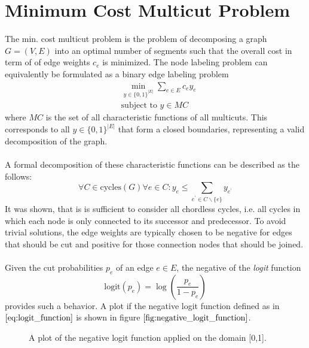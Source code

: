 

\section{Minimum Cost Multicut Problem}



The min. cost multicut problem is the problem of decomposing a graph $G = (V, E)$ into an optimal number of segments such that the overall cost in term of of edge weights $c_e$ is minimized. The node labeling problem can equivalently be formulated as a binary edge labeling problem
\begin{equation}
\begin{aligned}
& \min_{y \in \{0,1 \}^{|E|}} \sum_{e \in E} c_e y_e \\
& \text{subject to } y \in MC
\end{aligned}
\end{equation}
where $MC$ is the set of all characteristic functions of all multicuts. This corresponds to all $y \in \{0,1 \}^{|E|}$ that form a closed boundaries, representing a valid decomposition of the graph. \\ \\
A formal decomposition of these characteristic functions can be described as the follows:
\begin{equation}
	\forall C \in \text{cycles}(G) \forall e \in C: y_e \leq \sum_{e^{'} \in C \backslash \{e\}} y_{e^{'}}
\end{equation}
It was shown, that is is sufficient to consider all chordless cycles, i.e. all cycles in which each node is only connected to its successor and predecessor. To avoid trivial solutions, the edge weights are typically chosen to be negative for edges that should be cut and positive for those connection nodes that should be joined. \\ \\
Given the cut probabilities $p_e$ of an edge $e \in E$, the negative of the \textit{logit} function 
\begin{equation}
	\text{logit}\left( p_e \right) = \log \left( \frac{p_e}{1 - p_e} \right)
	\label{eq:logit_function}
\end{equation}
provides such a behavior. A plot if the negative logit function defined as in $\ref{eq:logit_function}$ is shown in figure $\ref{fig:negative_logit_function}$.
\begin{figure}
\centering
{}
\caption[Logit Function Plot]{A plot of the negative logit function applied on the domain [0,1].}
\label{fig:negative_logit_function}
\end{figure}
